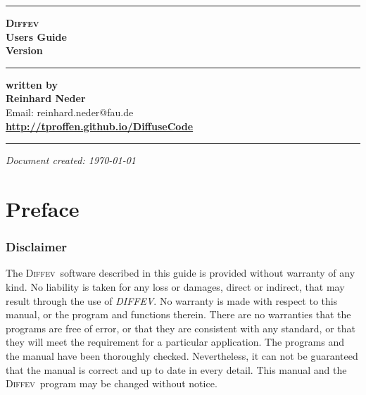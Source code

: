 \documentclass[11pt]{report}
\newcommand{\Diffev}{\textsc{Diffev\ }}
\newcommand{\diffev}{\textsc{Diffev}}
\begin{document}

\begin{titlepage}
\begin{flushright}

  \hrule
  \vspace{15mm}
  \textbf{{ \diffev}} \\
  \vspace{15mm}
  \textbf{{ Users Guide}} \\
  \vspace{10mm}
  \textbf{{\Huge Version  \version}} \\
  \vspace{10mm}

  \hrule
  \vspace{45mm}
  \textbf{written by} \\

  \vspace{5mm}
  \textbf{\Large Reinhard Neder} \\
  Email: reinhard.neder@fau.de \\

  \vspace{20mm}
  \textbf{\Large \url{http://tproffen.github.io/DiffuseCode}} \\

  \vspace{3mm}
  \hrule

\end{flushright}
\begin{flushright}
  \textit{Document created: \today}
\end{flushright}

\end{titlepage}


\chapter*{Preface}
\subsection*{Disclaimer}

The \Diffev software described in this guide is
provided without warranty of any kind.  No liability is taken for any loss
or damages, direct or indirect, that may result through the use of {\it
DIFFEV}.  No warranty is made with respect to this manual, or the program
and functions therein.  There are no warranties that the programs are free
of error, or that they are consistent with any standard, or that they will
meet the requirement for a particular application.  The programs and the
manual have been thoroughly checked.  Nevertheless, it can not be
guaranteed that the manual is correct and up to date in every detail. This
manual and the \Diffev program may be changed without notice.\par
\end{document}
